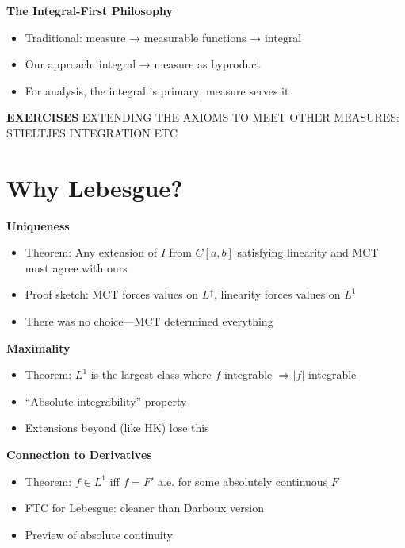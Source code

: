 \documentclass[
  10pt,
  letterpaper,
]{scrbook}
\providecommand{\tightlist}{%
  \setlength{\itemsep}{0pt}\setlength{\parskip}{0pt}}
\begin{document}
\textbf{The Integral-First Philosophy}

\begin{itemize}
\tightlist
\item
  Traditional: measure → measurable functions → integral
\item
  Our approach: integral → measure as byproduct
\item
  For analysis, the integral is primary; measure serves it
\end{itemize}

\textbf{EXERCISES} EXTENDING THE AXIOMS TO MEET OTHER MEASURES:
STIELTJES INTEGRATION ETC

\section{Why Lebesgue?}\label{why-lebesgue}

\textbf{Uniqueness}

\begin{itemize}
\tightlist
\item
  Theorem: Any extension of \(I\) from \(C[a,b]\) satisfying linearity
  and MCT must agree with ours
\item
  Proof sketch: MCT forces values on \(L^\uparrow\), linearity forces
  values on \(L^1\)
\item
  There was no choice---MCT determined everything
\end{itemize}

\textbf{Maximality}

\begin{itemize}
\tightlist
\item
  Theorem: \(L^1\) is the largest class where \(f\) integrable
  \(\Rightarrow |f|\) integrable
\item
  ``Absolute integrability'' property
\item
  Extensions beyond (like HK) lose this
\end{itemize}

\textbf{Connection to Derivatives}

\begin{itemize}
\tightlist
\item
  Theorem: \(f \in L^1\) iff \(f = F'\) a.e. for some absolutely
  continuous \(F\)
\item
  FTC for Lebesgue: cleaner than Darboux version
\item
  Preview of absolute continuity
\end{itemize}
\end{document}

